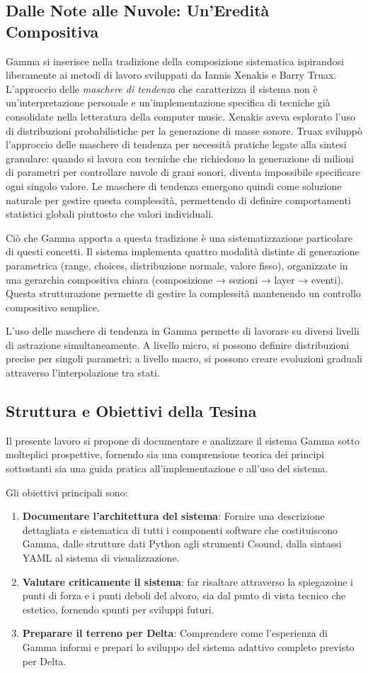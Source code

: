 \subsection{Dalle Note alle Nuvole: Un'Eredità Compositiva}
Gamma si inserisce nella tradizione della composizione sistematica ispirandosi liberamente ai metodi di lavoro sviluppati da Iannis Xenakis e Barry Truax. L'approccio delle \textit{maschere di tendenza} che caratterizza il sistema non è un'interpretazione personale e un'implementazione specifica di tecniche già consolidate nella letteratura della computer music. Xenakis aveva esplorato l'uso di distribuzioni probabilistiche per la generazione di masse sonore. Truax sviluppò l'approccio delle maschere di tendenza per necessità pratiche legate alla sintesi granulare: quando si lavora con tecniche che richiedono la generazione di milioni di parametri per controllare nuvole di grani sonori, diventa impossibile specificare ogni singolo valore. Le maschere di tendenza emergono quindi come soluzione naturale per gestire questa complessità, permettendo di definire comportamenti statistici globali piuttosto che valori individuali.

Ciò che Gamma apporta a questa tradizione è una sistematizzazione particolare di questi concetti. Il sistema implementa quattro modalità distinte di generazione parametrica (range, choices, distribuzione normale, valore fisso), organizzate in una gerarchia compositiva chiara (composizione → sezioni → layer → eventi). Questa strutturazione permette di gestire la complessità mantenendo un controllo compositivo semplice.

L'uso delle maschere di tendenza in Gamma permette di lavorare su diversi livelli di astrazione simultaneamente. A livello micro, si possono definire distribuzioni precise per singoli parametri; a livello macro, si possono creare evoluzioni graduali attraverso l'interpolazione tra stati.
\subsection{Struttura e Obiettivi della Tesina}
Il presente lavoro si propone di documentare e analizzare il sistema Gamma sotto molteplici prospettive, fornendo sia una comprensione teorica dei principi sottostanti sia una guida pratica all'implementazione e all'uso del sistema.

Gli obiettivi principali sono:

\begin{enumerate}
    \item \textbf{Documentare l'architettura del sistema}: Fornire una descrizione dettagliata e sistematica di tutti i componenti software che costituiscono Gamma, dalle strutture dati Python agli strumenti Csound, dalla sintassi YAML al sistema di visualizzazione.
    \item \textbf{Valutare criticamente il sistema}: far risaltare attraverso la spiegazoine i punti di forza e i punti deboli del alvoro, sia dal punto di vista tecnico che estetico, fornendo spunti per sviluppi futuri.
    \item \textbf{Preparare il terreno per Delta}: Comprendere come l'esperienza di Gamma informi e prepari lo sviluppo del sistema adattivo completo previsto per Delta.
\end{enumerate}